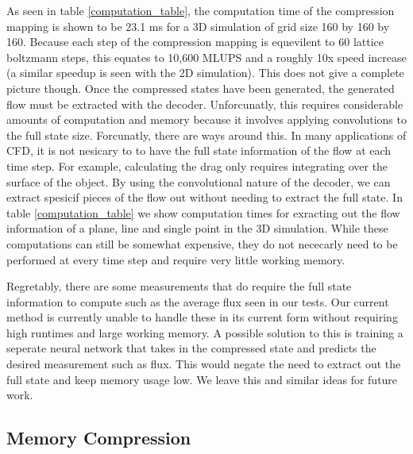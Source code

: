 \documentclass{article}
\begin{document}
As seen in table \ref{computation_table}, the computation time of the compression mapping is shown to be 23.1 ms for a 3D simulation of grid size 160 by 160 by 160. Because each step of the compression mapping is equevilent to 60 lattice boltzmann steps, this equates to 10,600 MLUPS and a roughly 10x speed increase (a similar speedup is seen with the 2D simulation). This does not give a complete picture though. Once the compressed states have been generated, the generated flow must be extracted with the decoder. Unforcunatly, this requires considerable amounts of computation and memory because it involves applying convolutions to the full state size. Forcunatly, there are ways around this. In many applications of CFD, it is not nesicary to to have the full state information of the flow at each time step. For example, calculating the drag only requires integrating over the surface of the object. By using the convolutional nature of the decoder, we can extract spesicif pieces of the flow out without needing to extract the full state. In table \ref{computation_table} we show computation times for exracting out the flow information of a plane, line and single point in the 3D simulation. While these computations can still be somewhat expensive, they do not nececarly need to be performed at every time step and require very little working memory. 

Regretably, there are some measurements that do require the full state information to compute such as the average flux seen in our tests. Our current method is currently unable to handle these in its current form without requiring high runtimes and large working memory. A possible solution to this is training a seperate neural network that takes in the compressed state and predicts the desired measurement such as flux. This would negate the need to extract out the full state and keep memory usage low. We leave this and similar ideas for future work.


\subsection{Memory Compression}
\end{document}
